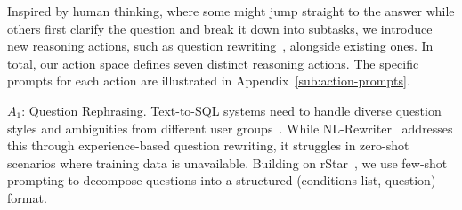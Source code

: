 Inspired by human thinking, where some might jump straight to the answer while others first clarify the question and break it down into subtasks, we introduce new reasoning actions, such as question rewriting~\cite{rStar}, alongside existing ones. 
In total, our action space defines seven distinct reasoning actions.
The specific prompts for each action are illustrated in Appendix~\ref{sub:action-prompts}.

\uline{$A_1$: Question Rephrasing.} 
Text-to-SQL systems need to handle diverse question styles and ambiguities from different user groups~\cite{nl2sql-survey}. 
While NL-Rewriter~\cite{nl-rewriter} addresses this through experience-based question rewriting, it struggles in zero-shot scenarios where training data is unavailable.
Building on rStar~\cite{rStar}, we use few-shot prompting to decompose questions into a structured (conditions list, question) format.

